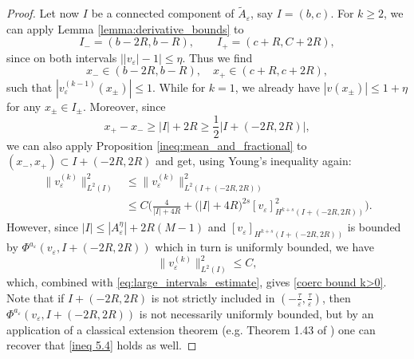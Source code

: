 \documentclass{article}
\theoremstyle{definition}
\newcommand{\abs}[1]{\left|#1\right|}
\newcommand{\e}{\varepsilon}
\def\e{\varepsilon}
\begin{document}
\begin{proof}
    Let now $I$ be a connected component of $\widetilde{A}_\e$, say $I=(b,c)$. For $k\geq 2$, we can apply Lemma \ref{lemma:derivative_bounds} to
    \[I_-=(b-2R,b-R),\qquad I_+=(c+R,C+2R),\]
    since on both intervals $\abs{\abs{v_\e}-1}\leq \eta$. Thus we find
    \[x_- \in (b-2R,b-R),\quad x_+\in (c+R,c+2R),\]
    such that $|v_\e^{(k-1)}(x_\pm)|\leq 1$. While for $k=1$, we already have $|v(x_\pm)|\leq 1+\eta$ for any $x_\pm \in I_\pm$.
    Moreover, since 
    \[ x_+-x_- \geq |I|+2R \geq\frac{1}{2}\big|I+(-2R,2R)\big|,\]
    we can also apply Proposition \ref{ineq:mean_and_fractional} to $(x_-,x_+)\subset I+(-2R,2R)$ and get, using Young's inequality again:
    \[
       \begin{split}
            \|v_\e^{(k)}\|_{L^2(I)}^2&\leq \|v_\e^{(k)}\|^2_{L^2(I+(-2R,2R))}\\
            &\leq C\bigg(\frac{4}{|I|+4R}+\big(|I|+4R\big)^{2s}[v_\e]^2_{H^{k+s}(I+(-2R,2R))}\bigg).
       \end{split}
    \]
    However, since  $|I| \leq |A^\eta_\e|+2R(M-1)$ and $[v_\e]_{H^{k+s}(I+(-2R,2R))}$ is bounded by $\Phi^{a_{\scriptstyle \e}}(v_\e, I+(-2R,2R))$ which in turn is uniformly bounded, we have 
    \begin{equation}
    \label{ineq 5.4}
        \|v_\e^{(k)}\|^2_{L^2(I)}\leq C,
    \end{equation}
    which, combined with \eqref{eq:large_intervals_estimate}, gives \eqref{coerc bound k>0}.
    Note that if $I+(-2R,2R)$ is not strictly included in $\left(-\frac{\tau}{\e}, \frac{\tau}{\e}\right)$, then $\Phi^{a_{\scriptstyle \e}}(v_\e, I+(-2R,2R))$ is not necessarily uniformly bounded, but by an application of a classical extension theorem (e.g. Theorem 1.43 of \cite{Leoni_frac_sob_sp}) one can recover that \eqref{ineq 5.4} holds as well. 
    

\end{proof}
\end{document}
